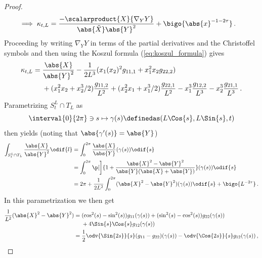 \documentclass[titlepage,numbers=noenddot,oneside,%
cleardoublepage=empty,paper=a4,fontsize=11pt,%
english,%
]{scrartcl}
\newcommand*{\mathcomma}{\,,}
\newcommand*{\mathfullstop}{\,.}
\begin{document}
\begin{proof}
\begin{align*}
        \implies \kappa_{t,L}&=\frac{-\scalarproduct{X}{\nabla_Y Y}}{\abs{\tilde{X}}\abs{Y}^2}+\bigo{\abs{x}^{-1-2\tau}}\mathfullstop
    \end{align*}
    Proceeding by writing \( \nabla_Y Y \) in terms of the partial derivatives and the Christoffel symbols and then using the Koszul formula (\cref{eq:koszul_formula}) gives
    \begin{equation}
        \kappa_{t,L}=\begin{aligned}[t]
            &\frac{\abs{X}}{\abs{Y}^2}-\frac{1}{2L^3}(x_1(x_2)^2 g_{11,1}+x_1^2 x_2 g_{22,2})\\
            &+(x_1^2 x_2+x_2^3/2)\frac{g_{11,2}}{L^2}+(x_2^2 x_1+x_1^3/2)\frac{g_{22,1}}{L^2}-x_1^3 \frac{g_{12,2}}{L^3}-x_2^3\frac{g_{21,1}}{L^3}\mathfullstop
        \end{aligned}\label{eq:geodesic_curvature_asymptotic}
    \end{equation}
    Parametrizing \( S_t^L\cap T_L \) as
    \begin{equation*}
        \interval{0}{2\pi}\ni s\mapsto \gamma(s)\definedas (L\Cos{s},L\Sin{s},t)
    \end{equation*}
    then yields (noting that \( \abs{\gamma'(s)}=\abs{Y} \))
    \begin{equation*}
        \begin{aligned}[t]
            \int_{S_t^L\cap T_L}\frac{\abs{X}}{\abs{Y}^2}\odif{l}&=\int_{0}^{2\pi}\frac{\abs{X}}{\abs{Y}}(\gamma(s))\odif{s}\\
            &=\int_0^{2\pi}\p[\bigg]{1+\frac{\abs{X}^2-\abs{Y}^2}{\abs{Y}(\abs{X}+\abs{Y})}}(\gamma(s))\odif{s}\\
            &=2\pi+\frac{1}{2L^2}\int_0^{2\pi}(\abs{X}^2-\abs{Y}^2)(\gamma(s))\odif{s}+\bigo{L^{-2\tau}}\mathfullstop
        \end{aligned}
    \end{equation*}
    In this parametrization we then get
    \begin{equation*}
        \begin{aligned}[t]
            \frac{1}{L^2}(\abs{X}^2-\abs{Y}^2)&=\begin{aligned}[t]
                &(\cos^2(s)-\sin^2(s))g_{11}(\gamma(s))+(\sin^2(s)-\cos^2(s))g_{22}(\gamma(s))\\
                &+4\Sin{s}\Cos{s}g_{12}(\gamma(s))
            \end{aligned}\\
            &=\frac{1}{2}\odv{\Sin{2s}}{s}(g_{11}-g_{22})(\gamma(s))-\odv{\Cos{2s}}{s}g_{12}(\gamma(s))\mathcomma

\end{aligned}
\end{equation*}
\end{proof}
\end{document}
